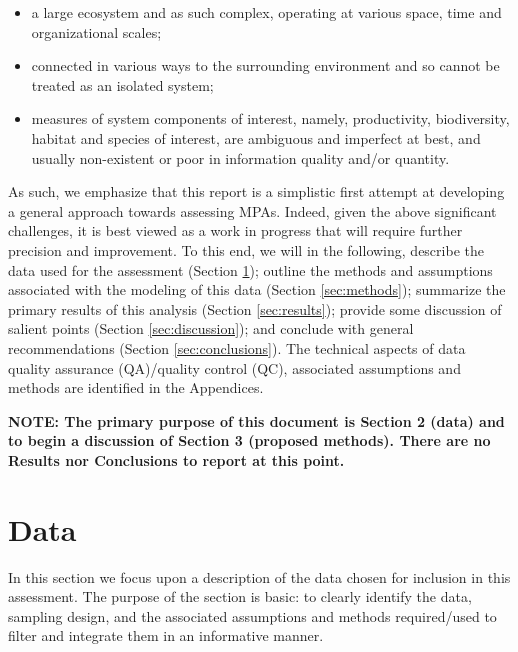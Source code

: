 \documentclass[letterpaper,portrait,11pt]{scrartcl}
\numberwithin{equation}{section}    %
\numberwithin{figure}{section}    %
\numberwithin{table}{section}       %
\begin{document}
\begin{itemize}
	\item a large ecosystem and as such complex, operating at various space, time and organizational scales;
	\item connected in various ways to the surrounding environment and so cannot be treated as an isolated system;
	\item measures of system components of interest, namely, productivity, biodiversity, habitat and species of interest, are ambiguous and imperfect at best, and usually non-existent or poor in information quality and/or quantity.
\end{itemize}


As such, we emphasize that this report is a simplistic first attempt at developing a general approach towards assessing MPAs. Indeed, given the above significant challenges, it is best viewed as a work in progress that will require further precision and improvement. To this end, we will in the following, describe the data used for the assessment (Section \ref{sec:data}); outline the methods and assumptions associated with the modeling of this data (Section \ref{sec:methods}); summarize the primary results of this analysis (Section \ref{sec:results}); provide some discussion of salient points (Section \ref{sec:discussion}); and conclude with general recommendations (Section \ref{sec:conclusions}). The technical aspects of data quality assurance (QA)/quality control (QC), associated assumptions and methods are identified in the Appendices.

\medskip

\textbf{NOTE: The primary purpose of this document is Section 2 (data) and to begin a discussion of Section 3 (proposed methods). There are no Results nor Conclusions to report at this point. }


\afterpage{\clearpage}
\section{Data}
\label{sec:data}

In this section we focus upon a description of the data chosen for inclusion in this assessment. The purpose of the section is basic: to clearly identify the data, sampling design, and the associated assumptions and methods required/used to filter and integrate them in an informative manner.
\end{document}
